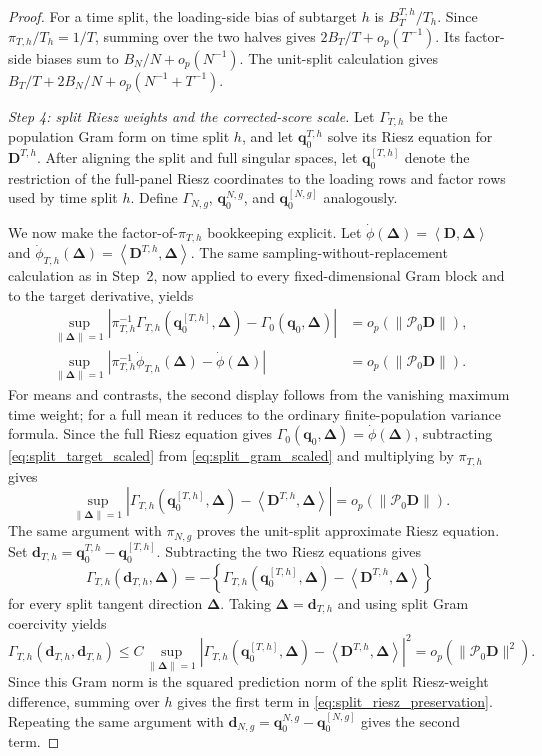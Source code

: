 \documentclass[11pt]{article}
\numberwithin{equation}{section}
\theoremstyle{remark}
\newcommand{\ip}[2]{\left\langle #1,#2\right\rangle}
\newcommand{\bq}{\bm q}
\newcommand{\bD}{\bm D}
\newcommand{\bDelta}{\bm\Delta}
\newcommand{\calP}{\mathcal P}
\begin{document}
\begin{proof}
For a time split, the loading-side bias of subtarget $h$ is $B_T^{T,h}/T_h$. Since $\pi_{T,h}/T_h=1/T$, summing over the two halves gives $2B_T/T+o_p(T^{-1})$. Its factor-side biases sum to $B_N/N+o_p(N^{-1})$. The unit-split calculation gives $B_T/T+2B_N/N+o_p(N^{-1}+T^{-1})$.

\emph{Step 4: split Riesz weights and the corrected-score scale.}
Let $\Gamma_{T,h}$ be the population Gram form on time split $h$, and let $\bq_0^{T,h}$ solve its Riesz equation for $\bD^{T,h}$. After aligning the split and full singular spaces, let $\bq_0^{[T,h]}$ denote the restriction of the full-panel Riesz coordinates to the loading rows and factor rows used by time split $h$. Define $\Gamma_{N,g}$, $\bq_0^{N,g}$, and $\bq_0^{[N,g]}$ analogously.

We now make the factor-of-$\pi_{T,h}$ bookkeeping explicit. Let $\dot\phi(\bDelta)=\ip{\bD}{\bDelta}$ and $\dot\phi_{T,h}(\bDelta)=\ip{\bD^{T,h}}{\bDelta}$. The same sampling-without-replacement calculation as in Step~2, now applied to every fixed-dimensional Gram block and to the target derivative, yields
\begin{align}
\sup_{\|\bDelta\|=1}
\left|
\pi_{T,h}^{-1}
\Gamma_{T,h}(\bq_0^{[T,h]},\bDelta)
-
\Gamma_0(\bq_0,\bDelta)
\right|
&=
o_p(\|\calP_0\bD\|),
\label{eq:split_gram_scaled}\\
\sup_{\|\bDelta\|=1}
\left|
\pi_{T,h}^{-1}
\dot\phi_{T,h}(\bDelta)
-
\dot\phi(\bDelta)
\right|
&=
o_p(\|\calP_0\bD\|).
\label{eq:split_target_scaled}
\end{align}
For means and contrasts, the second display follows from the vanishing maximum time weight; for a full mean it reduces to the ordinary finite-population variance formula. Since the full Riesz equation gives $\Gamma_0(\bq_0,\bDelta)=\dot\phi(\bDelta)$, subtracting \eqref{eq:split_target_scaled} from \eqref{eq:split_gram_scaled} and multiplying by $\pi_{T,h}$ gives
$$
\sup_{\|\bDelta\|=1}
\left|
\Gamma_{T,h}(\bq_0^{[T,h]},\bDelta)
-
\ip{\bD^{T,h}}{\bDelta}
\right|
=
o_p(\|\calP_0\bD\|).
$$
The same argument with $\pi_{N,g}$ proves the unit-split approximate Riesz equation. Set $\bm d_{T,h}=\bq_0^{T,h}-\bq_0^{[T,h]}$. Subtracting the two Riesz equations gives
$$
\Gamma_{T,h}(\bm d_{T,h},\bDelta)
=
-\left\{
\Gamma_{T,h}(\bq_0^{[T,h]},\bDelta)
-
\ip{\bD^{T,h}}{\bDelta}
\right\}
$$
for every split tangent direction $\bDelta$. Taking $\bDelta=\bm d_{T,h}$ and using split Gram coercivity yields
$$
\Gamma_{T,h}(\bm d_{T,h},\bm d_{T,h})
\le
C
\sup_{\|\bDelta\|=1}
\left|
\Gamma_{T,h}(\bq_0^{[T,h]},\bDelta)
-
\ip{\bD^{T,h}}{\bDelta}
\right|^2
=
o_p(\|\calP_0\bD\|^2).
$$
Since this Gram norm is the squared prediction norm of the split Riesz-weight difference, summing over $h$ gives the first term in \eqref{eq:split_riesz_preservation}. Repeating the same argument with $\bm d_{N,g}=\bq_0^{N,g}-\bq_0^{[N,g]}$ gives the second term.


\end{proof}
\end{document}
